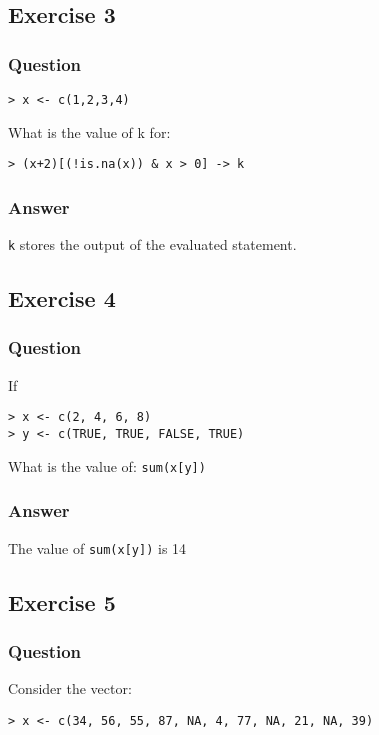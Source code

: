 \documentclass[11pt]{article}
\begin{document}
\subsection{Exercise 3}
\label{sec:orgaca3d38}
\subsubsection{Question}
\label{sec:org8a74de2}
\begin{verbatim}
> x <- c(1,2,3,4)
\end{verbatim}

What is the value of k for:
\begin{verbatim}
> (x+2)[(!is.na(x)) & x > 0] -> k
\end{verbatim}

\subsubsection{Answer}
\label{sec:org38f6513}
\texttt{k} stores the output of the evaluated statement.

\subsection{Exercise 4}
\label{sec:orgb25b1d9}
\subsubsection{Question}
\label{sec:org3fd77dd}
If
\begin{verbatim}
> x <- c(2, 4, 6, 8)
> y <- c(TRUE, TRUE, FALSE, TRUE)
\end{verbatim}

What is the value of: \texttt{sum(x[y])}

\subsubsection{Answer}
\label{sec:org571159d}
The value of \texttt{sum(x[y])} is 14

\subsection{Exercise 5}
\label{sec:orgfc28f85}
\subsubsection{Question}
\label{sec:org5de2a13}
Consider the vector:

\begin{verbatim}
> x <- c(34, 56, 55, 87, NA, 4, 77, NA, 21, NA, 39)
\end{verbatim}
\end{document}
